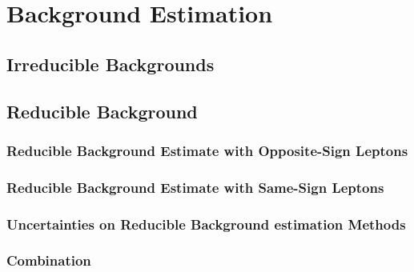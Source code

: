 \section{Background Estimation}

\subsection{Irreducible Backgrounds}
\label{sec:irrbkgd}


\clearpage

\subsection{Reducible Background}
\label{sec:zxIntr}



\subsubsection{Reducible Background Estimate with Opposite-Sign Leptons}
\label{sec:zxOS}



\subsubsection{Reducible Background Estimate with Same-Sign Leptons}
\label{sec:zxSS}



\subsubsection{Uncertainties on Reducible Background estimation Methods} %
\label{sec:zxUncert}


 
\subsubsection{Combination}
\label{sec:zxComb}

